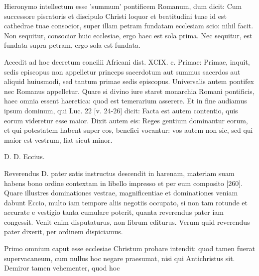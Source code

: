 Hieronymo intellectum esse 'summum' pontificem Romanum, dum dicit: Cum successore piscatoris et discipulo Christi loquor et beatitudini tuae id est cathedrae tuae consocior, super illam petram fundatam ecclesiam scio: nihil facit. Non sequitur, consocior huic ecclesiae, ergo haec est sola prima. Nec sequitur, est fundata supra petram, ergo sola est fundata.

Accedit ad hoc decretum concilii Africani dist. XCIX. c. Primae: Primae, inquit, sedis episcopus non appelletur princeps sacerdotum aut summus sacerdos aut aliquid huiusmodi, sed tantum primae sedis episcopus. Universalis autem pontifex nec Romanus appelletur. Quare si divino iure staret monarchia Romani pontificis, haec omnia essent haeretica: quod est temerarium asserere. Et in fine audiamus ipsum dominum, qui Luc. 22 [v. 24-26] dicit: Facta est autem contentio, quis eorum videretur esse maior. Dixit autem eis: Reges gentium dominantur eorum, et qui potestatem habent super eos, benefici vocantur: vos autem non sic, sed qui maior est vestrum, fiat sicut minor.

D. D. Eccius.

Reverendus D. pater satis instructus descendit in harenam, materiam suam habens bono ordine contextam in libello impresso et per eum composito [260]. Quare illustres dominationes vestrae, magnificentiae et dominationes veniam dabunt Eccio, multo iam tempore aliis negotiis occupato, si non tam rotunde et accurate e vestigio tanta cumulare poterit, quanta reverendus pater iam congessit. Venit enim disputaturus, non librum editurus. Verum quid reverendus pater dixerit, per ordinem dispiciamus.

Primo omnium caput esse ecclesiae Christum probare intendit: quod tamen fuerat supervacaneum, cum nullus hoc negare praesumat, nisi qui Antichristus sit. Demiror tamen vehementer, quod hoc

